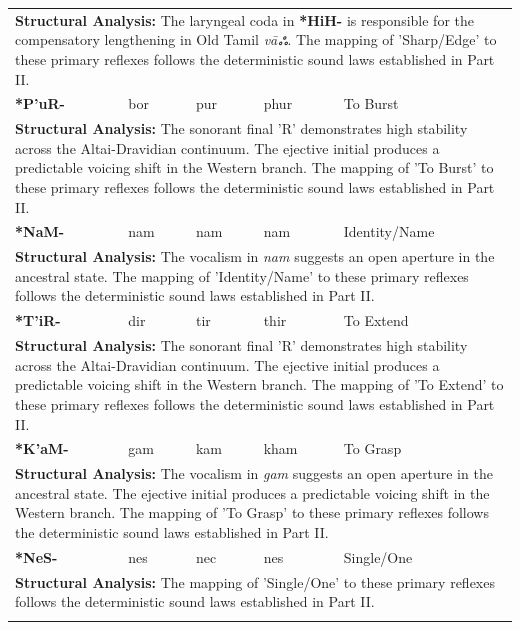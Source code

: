 \begin{longtable}{p{} p{} p{} p{} p{}}
\multicolumn{5}{p{\textwidth}}{\small \textbf{Structural Analysis:} The laryngeal coda in \textbf{*HiH-} is responsible for the compensatory lengthening in Old Tamil \textit{vāஃ}. The mapping of 'Sharp/Edge' to these primary reflexes follows the deterministic sound laws established in Part II.} \\ \addlinespace[15pt] 
\textbf{*P'uR-} & bor & pur & phur & To Burst \\ 
\multicolumn{5}{p{\textwidth}}{\small \textbf{Structural Analysis:} The sonorant final 'R' demonstrates high stability across the Altai-Dravidian continuum. The ejective initial produces a predictable voicing shift in the Western branch. The mapping of 'To Burst' to these primary reflexes follows the deterministic sound laws established in Part II.} \\ \addlinespace[15pt] 
\textbf{*NaM-} & nam & nam & nam & Identity/Name \\ 
\multicolumn{5}{p{\textwidth}}{\small \textbf{Structural Analysis:} The vocalism in \textit{nam} suggests an open aperture in the ancestral state. The mapping of 'Identity/Name' to these primary reflexes follows the deterministic sound laws established in Part II.} \\ \addlinespace[15pt] 
\textbf{*T'iR-} & dir & tir & thir & To Extend \\ 
\multicolumn{5}{p{\textwidth}}{\small \textbf{Structural Analysis:} The sonorant final 'R' demonstrates high stability across the Altai-Dravidian continuum. The ejective initial produces a predictable voicing shift in the Western branch. The mapping of 'To Extend' to these primary reflexes follows the deterministic sound laws established in Part II.} \\ \addlinespace[15pt] 
\textbf{*K'aM-} & gam & kam & kham & To Grasp \\ 
\multicolumn{5}{p{\textwidth}}{\small \textbf{Structural Analysis:} The vocalism in \textit{gam} suggests an open aperture in the ancestral state. The ejective initial produces a predictable voicing shift in the Western branch. The mapping of 'To Grasp' to these primary reflexes follows the deterministic sound laws established in Part II.} \\ \addlinespace[15pt] 
\textbf{*NeS-} & nes & nec & nes & Single/One \\ 
\multicolumn{5}{p{\textwidth}}{\small \textbf{Structural Analysis:}  The mapping of 'Single/One' to these primary reflexes follows the deterministic sound laws established in Part II.} \\ \addlinespace[15pt] 

\end{longtable}

